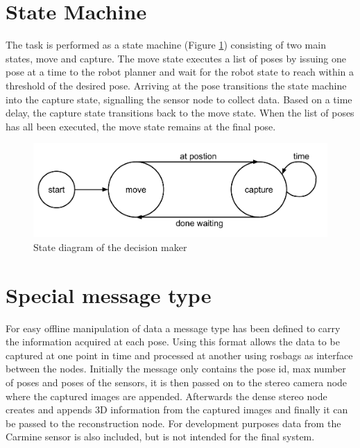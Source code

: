 
\section{State Machine}
The task is performed as a state machine (Figure \ref{fig:state_diagram}) consisting of two main states, move and capture. The move state executes a list of poses by issuing one pose at a time to the robot planner and wait for the robot state to reach within a threshold of the desired pose. Arriving at the pose transitions the state machine into the capture state, signalling the sensor node to collect data. Based on a time delay, the capture state transitions back to the move state. When the list of poses has all been executed, the move state remains at the final pose.


\begin{figure}[htb]
	\begin{center}
		\includegraphics[scale=0.5,trim=0 0 0 0]{graphics/04_decisionmaking/state_diagram.pdf}%
		\caption{State diagram of the decision maker}
		\label{fig:state_diagram}
	\end{center}
\end{figure}

\section{Special message type}
For easy offline manipulation of data a message type has been defined to carry the information acquired at each pose. Using this format allows the data to be captured at one point in time and processed at another using rosbags as interface between the nodes. Initially the message only contains the pose id, max number of poses and poses of the sensors, it is then passed on to the stereo camera node where the captured images are appended. Afterwards the dense stereo node creates and appends 3D information from the captured images and finally it can be passed to the reconstruction node. For development purposes data from the Carmine sensor is also included, but is not intended for the final system.

